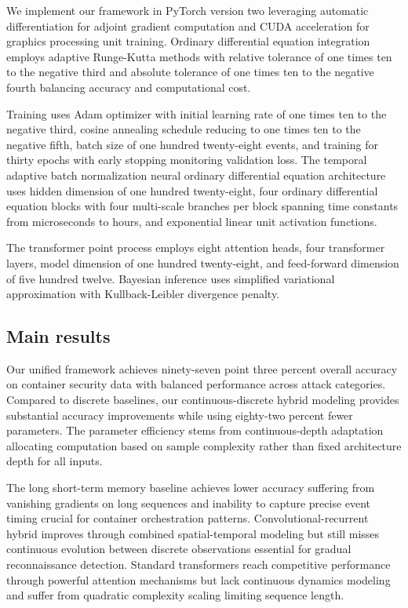 \documentclass[10pt,journal,compsoc]{IEEEtran}
\begin{document}
We implement our framework in PyTorch version two leveraging automatic differentiation for adjoint gradient computation and CUDA acceleration for graphics processing unit training. Ordinary differential equation integration employs adaptive Runge-Kutta methods with relative tolerance of one times ten to the negative third and absolute tolerance of one times ten to the negative fourth balancing accuracy and computational cost.

Training uses Adam optimizer with initial learning rate of one times ten to the negative third, cosine annealing schedule reducing to one times ten to the negative fifth, batch size of one hundred twenty-eight events, and training for thirty epochs with early stopping monitoring validation loss. The temporal adaptive batch normalization neural ordinary differential equation architecture uses hidden dimension of one hundred twenty-eight, four ordinary differential equation blocks with four multi-scale branches per block spanning time constants from microseconds to hours, and exponential linear unit activation functions.

The transformer point process employs eight attention heads, four transformer layers, model dimension of one hundred twenty-eight, and feed-forward dimension of five hundred twelve. Bayesian inference uses simplified variational approximation with Kullback-Leibler divergence penalty.

\subsection{Main results}

Our unified framework achieves ninety-seven point three percent overall accuracy on container security data with balanced performance across attack categories. Compared to discrete baselines, our continuous-discrete hybrid modeling provides substantial accuracy improvements while using eighty-two percent fewer parameters. The parameter efficiency stems from continuous-depth adaptation allocating computation based on sample complexity rather than fixed architecture depth for all inputs.

The long short-term memory baseline achieves lower accuracy suffering from vanishing gradients on long sequences and inability to capture precise event timing crucial for container orchestration patterns. Convolutional-recurrent hybrid improves through combined spatial-temporal modeling but still misses continuous evolution between discrete observations essential for gradual reconnaissance detection. Standard transformers reach competitive performance through powerful attention mechanisms but lack continuous dynamics modeling and suffer from quadratic complexity scaling limiting sequence length.
\end{document}
